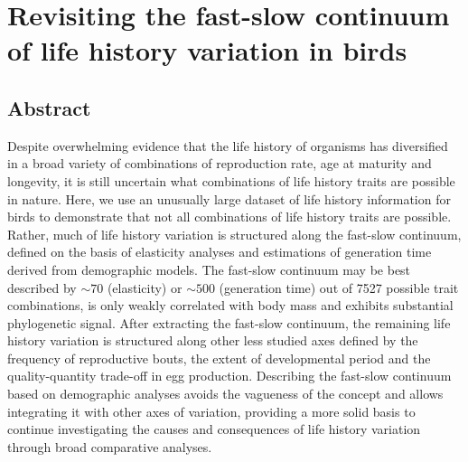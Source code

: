 \chapter[Axes of life history variation]{Revisiting the fast-slow continuum of 
life history variation in birds}\label{ch:LHaxes}


\section*{Abstract}

Despite overwhelming evidence that the life history of organisms has diversified
in a broad variety of combinations of reproduction rate, age at maturity and
longevity, it is still uncertain what combinations of life history traits are
possible in nature. Here, we use an unusually large dataset of life history
information for birds to demonstrate that not all combinations of life history
traits are possible. Rather, much of life history variation is structured along
the fast-slow continuum, defined on the basis of elasticity analyses and
estimations of generation time derived from demographic models. The fast-slow
continuum may be best described by $\sim70$ (elasticity) or $\sim500$
(generation time) out of 7527 possible trait combinations, is only weakly
correlated with body mass and exhibits substantial phylogenetic signal. After
extracting the fast-slow continuum, the remaining life history variation is
structured along other less studied axes defined by the frequency of
reproductive bouts, the extent of developmental period and the quality-quantity
trade-off in egg production. Describing the fast-slow continuum based on
demographic analyses avoids the vagueness of the concept and allows integrating
it with other axes of variation, providing a more solid basis to continue
investigating the causes and consequences of life history variation through
broad comparative analyses.


